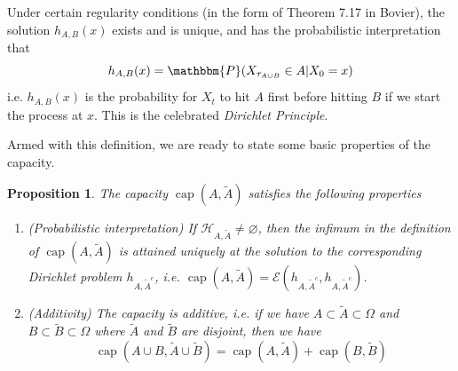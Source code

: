 \documentclass[english, aip, jcp, priprint, graphicx,floatfix]{revtex4-1}
\newtheorem{proposition}{Proposition}
\theoremstyle{plain}
\theoremstyle{definition}
\theoremstyle{plain}
\begin{document}
Under certain regularity conditions (in the form of Theorem 7.17 in
Bovier\cite{Bovier2016-ez}), the solution $h_{A, B} (x)$ exists and is
unique, and has the probabilistic interpretation that
\[ h_{A, B} (x) =\mathbbm{P} (X_{\tau_{A \cup B}} \in A|X_0 = x) \]
i.e. $h_{A, B} (x)$ is the probability for $X_t$ to hit $A$ first before
hitting $B$ if we start the process at $x$. This is the celebrated
{\itshape{Dirichlet Principle}}.

Armed with this definition, we are ready to state some basic properties of the
capacity.

\begin{proposition}\label{prop:capacity}
The capacity $\ensuremath{\operatorname{cap}} (A, \tilde{A})$ satisfies the
following properties
\begin{enumerate}
\item (Probabilistic interpretation) If $\mathcal{H}_{A, \tilde{A}} \neq
\varnothing$, then the infimum in the definition of
$\ensuremath{\operatorname{cap}} (A, \tilde{A})$ is attained uniquely at
the solution to the corresponding Dirichlet problem $h_{A, \tilde{A}^c}$,
i.e. $\ensuremath{\operatorname{cap}} (A, \tilde{A}) = \mathcal{E} (h_{A,
\tilde{A}^c}, h_{A, \tilde{A}^c})$.

\item (Additivity) The capacity is additive, i.e. if we have $A \subset
\tilde{A} \subset \Omega$ and $B \subset \tilde{B} \subset \Omega$ where
$\tilde{A}$ and $\tilde{B}$ are disjoint, then we have
\[ \ensuremath{\operatorname{cap}} (A \cup B, \tilde{A} \cup \tilde{B})
=\ensuremath{\operatorname{cap}} (A, \tilde{A})
+\ensuremath{\operatorname{cap}} (B, \tilde{B}) \]
\end{enumerate}
\end{proposition}
\end{document}
